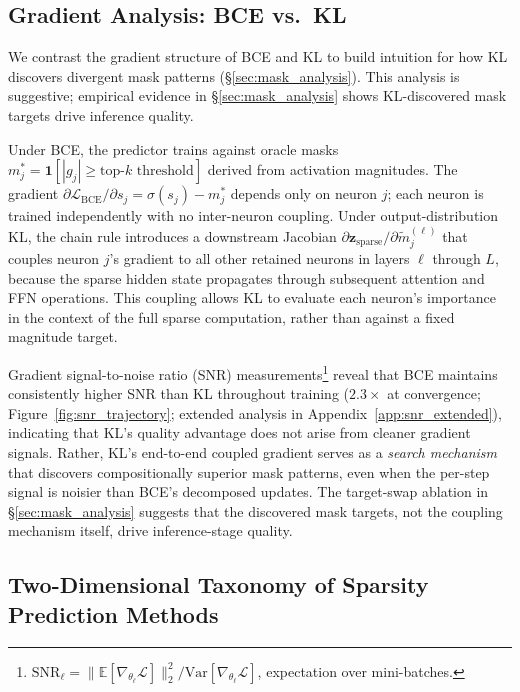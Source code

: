 \subsection{Gradient Analysis: BCE vs.\ KL}
\label{sec:method:gradient}

We contrast the gradient structure of BCE and KL to build intuition for how KL discovers divergent mask patterns (\S\ref{sec:mask_analysis}). This analysis is suggestive; empirical evidence in \S\ref{sec:mask_analysis} shows KL-discovered mask targets drive inference quality.

Under BCE, the predictor trains against oracle masks $m_j^* = \mathbf{1}[|g_j| \geq \text{top-}k\text{ threshold}]$ derived from activation magnitudes.
The gradient $\partial \mathcal{L}_{\text{BCE}} / \partial s_j = \sigma(s_j) - m_j^*$ depends only on neuron $j$; each neuron is trained independently with no inter-neuron coupling.
Under output-distribution KL, the chain rule introduces a downstream Jacobian $\partial \mathbf{z}_{\text{sparse}} / \partial \tilde{m}_j^{(\ell)}$ that couples neuron $j$'s gradient to all other retained neurons in layers $\ell$ through $L$, because the sparse hidden state propagates through subsequent attention and FFN operations.
This coupling allows KL to evaluate each neuron's importance in the context of the full sparse computation, rather than against a fixed magnitude target.

Gradient signal-to-noise ratio (SNR) measurements\footnote{$\text{SNR}_\ell = \|\mathbb{E}[\nabla_{\theta_\ell} \mathcal{L}]\|_2^2 / \text{Var}[\nabla_{\theta_\ell} \mathcal{L}]$, expectation over mini-batches.} reveal that BCE maintains consistently higher SNR than KL throughout training ($2.3\times$ at convergence; Figure~\ref{fig:snr_trajectory}; extended analysis in Appendix~\ref{app:snr_extended}), indicating that KL's quality advantage does not arise from cleaner gradient signals.
Rather, KL's end-to-end coupled gradient serves as a \emph{search mechanism} that discovers compositionally superior mask patterns, even when the per-step signal is noisier than BCE's decomposed updates.
The target-swap ablation in \S\ref{sec:mask_analysis} suggests that the discovered mask targets, not the coupling mechanism itself, drive inference-stage quality.

\subsection{Two-Dimensional Taxonomy of Sparsity Prediction Methods}
\label{sec:method:taxonomy}

